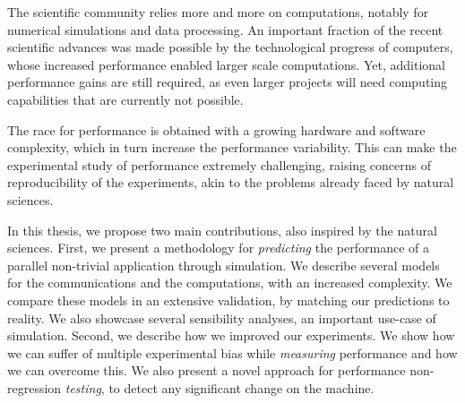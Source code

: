 The scientific community relies more and more on computations, notably for numerical simulations and data processing. An
important fraction of the recent scientific advances was made possible by the technological progress of computers, whose
increased performance enabled larger scale computations. Yet, additional performance gains are still required, as even
larger projects will need computing capabilities that are currently not possible.

The race for performance is obtained with a growing hardware and software complexity, which in turn increase the
performance variability. This can make the experimental study of performance extremely challenging, raising concerns of
reproducibility of the experiments, akin to the problems already faced by natural sciences.

In this thesis, we propose two main contributions, also inspired by the natural sciences. First, we present a
methodology for \emph{predicting} the performance of a parallel non-trivial application through simulation. We describe
several models for the communications and the computations, with an increased complexity. We compare these models in an
extensive validation, by matching our predictions to reality. We also showcase several sensibility analyses, an
important use-case of simulation. Second, we describe how we improved our experiments. We show how we can suffer of
multiple experimental bias while \emph{measuring} performance and how we can overcome this. We also present a novel
approach for performance non-regression \emph{testing}, to detect any significant change on the machine.
